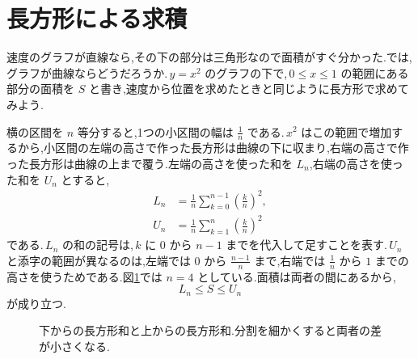 \section{長方形による求積}\label{節:導入長方形}
速度のグラフが直線なら,その下の部分は三角形なので面積がすぐ分かった.では,グラフが曲線ならどうだろうか.\,$y=x^2$ のグラフの下で,\,$0\le x\le1$ の範囲にある部分の面積を $S$ と書き,速度から位置を求めたときと同じように長方形で求めてみよう.

横の区間を $n$ 等分すると,1つの小区間の幅は $\frac1n$ である.\,$x^2$ はこの範囲で増加するから,小区間の左端の高さで作った長方形は曲線の下に収まり,右端の高さで作った長方形は曲線の上まで覆う.左端の高さを使った和を $L_n$,右端の高さを使った和を $U_n$ とすると,
\begin{align*}
 L_n&=\frac1n\sum_{k=0}^{n-1}\left(\frac{k}{n}\right)^2,\\
 U_n&=\frac1n\sum_{k=1}^{n}\left(\frac{k}{n}\right)^2
\end{align*}
である.\,$L_n$ の和の記号は,\,$k$ に $0$ から $n-1$ までを代入して足すことを表す.\,$U_n$ と添字の範囲が異なるのは,左端では $0$ から $\frac{n-1}{n}$ まで,右端では $\frac1n$ から $1$ までの高さを使うためである.図\ref{図:導入長方形}では $n=4$ としている.面積は両者の間にあるから,
\[
 L_n\le S\le U_n
\]
が成り立つ.

\begin{figure}[htbp]
\centering
{}
\caption{下からの長方形和と上からの長方形和.分割を細かくすると両者の差が小さくなる.}
\label{図:導入長方形}
\end{figure}

